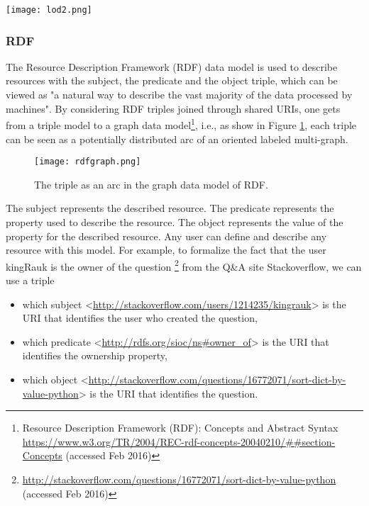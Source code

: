 \begin{sidewaysfigure}%
\centering
\texttt{[image: lod2.png]}  
\caption{Linked Open Data cloud diagram.}
\label{fig:lod} 
\end{sidewaysfigure}

\subsubsection{RDF}
The Resource Description Framework (RDF) data model is used to describe resources with the subject, the predicate and the object triple, which can be viewed as "a natural way to describe the vast majority of the data processed by machines". 
By considering  RDF triples joined through shared URIs, one gets from a triple model to a graph data model\footnote{Resource Description Framework (RDF): Concepts and Abstract Syntax \url{https://www.w3.org/TR/2004/REC-rdf-concepts-20040210/##section-Concepts} (accessed Feb 2016)}, i.e., as show in Figure \ref{fig:rdfgraph}, each triple can be seen as a potentially distributed arc of an oriented labeled multi-graph. 

\begin{figure}%
\centering
\texttt{[image: rdfgraph.png]}  
\caption{The triple as an arc in the graph data model of RDF.}
\label{fig:rdfgraph} 
\end{figure}

The subject represents the described resource. The predicate represents the property used to describe the resource. The object represents the value of the property for the described resource. Any user can define and describe any resource with this model. 
For example, to formalize the fact that the user kingRauk is the owner of the question \footnote{\url{http://stackoverflow.com/questions/16772071/sort-dict-by-value-python} (accessed Feb 2016)} from the Q\&A site Stackoverflow, we can use a triple 
\begin{itemize}
\item which subject <\url{http://stackoverflow.com/users/1214235/kingrauk}> is the URI that identifies the user who created the question,
\item which predicate <\url{http://rdfs.org/sioc/ns#owner_of}> is the URI that identifies the ownership property,
\item which object <\url{http://stackoverflow.com/questions/16772071/sort-dict-by-value-python}> is the URI that identifies the question.
\end{itemize}


